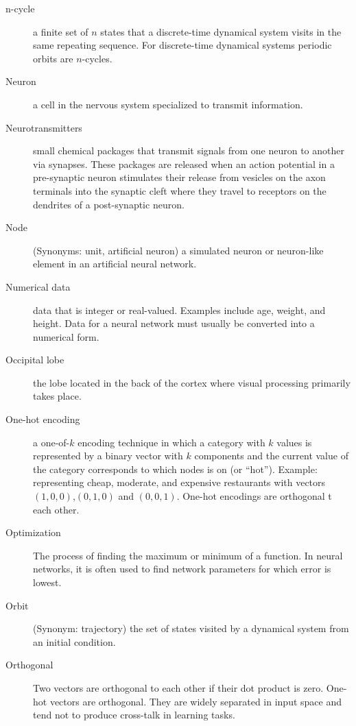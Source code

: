 \begin{description}
\item[n-cycle] a finite set of $n$ states that a discrete-time dynamical system visits in the same repeating sequence. For discrete-time dynamical systems periodic orbits are $n$-cycles.

\item[Neuron] a cell in the nervous system specialized to transmit information.

\item[Neurotransmitters] small chemical packages that transmit signals from one neuron to another via synapses. These packages are released when an action potential in a pre-synaptic neuron stimulates their release from vesicles on the axon terminals into the synaptic cleft where they travel to receptors on the dendrites of a post-synaptic neuron. 

\item[Node] (Synonyms: unit, artificial neuron) a simulated neuron or neuron-like element in an artificial neural network. 

\item[Numerical data] data that is integer or real-valued. Examples include age, weight, and height. Data for a neural network must usually be converted into a numerical form.

\item[Occipital lobe] the lobe located in the back of the cortex where visual processing primarily takes place. 

\item[One-hot encoding] a one-of-$k$ encoding technique in which  a category with $k$ values is represented by a binary vector with $k$ components and the current value of the category corresponds to which nodes is on (or ``hot''). Example: representing cheap, moderate, and expensive restaurants with vectors $(1,0,0)$,$(0,1,0)$ and $(0,0,1)$. One-hot encodings are orthogonal t each other.

\item[Optimization] The process of finding the maximum or minimum of a function. In neural networks, it is often used to find network parameters for which error is lowest.

\item[Orbit] (Synonym: trajectory) the set of states visited by a dynamical system from an initial condition. 

\item[Orthogonal] Two vectors are orthogonal to each other if their dot product is zero. One-hot vectors are orthogonal. They are widely separated in input space and tend not to produce cross-talk in learning tasks.


\end{description}
